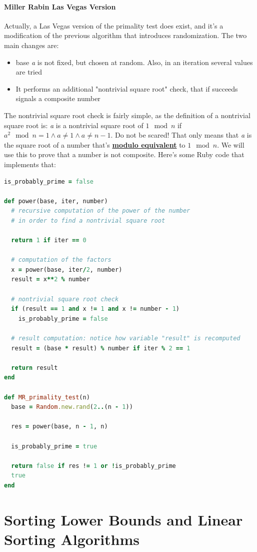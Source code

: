 \documentclass{article}
\begin{document}
				\paragraph{Miller Rabin Las Vegas Version}
					Actually, a Las Vegas version of the primality test does exist, and it's a modification of the previous algorithm that introduces randomization. The two main changes are:
					\begin{itemize}
						\item base \emph{a} is not fixed, but chosen at random. Also, in an iteration several values are tried
						\item It performs an additional "nontrivial square root" check, that if succeeds signals a composite number
					\end{itemize}
					The nontrivial square root check is fairly simple, as the definition of a nontrivial square root is: \emph{a} is a nontrivial square root of $1 \mod n$ if $a^2 \mod n = 1 \wedge a \neq 1 \wedge a \neq n - 1$. Do not be scared! That only means that \emph{a} is the square root of a number that's \textbf{\underline{modulo equivalent}} to $1 \mod n$. We will use this to prove that a number is not composite. Here's some Ruby code that implements that:
					\begin{lstlisting}[language=Ruby]
is_probably_prime = false

def power(base, iter, number)
  # recursive computation of the power of the number
  # in order to find a nontrivial square root

  return 1 if iter == 0
  
  # computation of the factors
  x = power(base, iter/2, number)
  result = x**2 % number

  # nontrivial square root check
  if (result == 1 and x != 1 and x != number - 1)
    is_probably_prime = false 
  
  # result computation: notice how variable "result" is recomputed
  result = (base * result) % number if iter % 2 == 1

  return result
end

def MR_primality_test(n)
  base = Random.new.rand(2..(n - 1))

  res = power(base, n - 1, n)
  
  is_probably_prime = true

  return false if res != 1 or !is_probably_prime
  true
end
					\end{lstlisting}

	
	\section{Sorting Lower Bounds and Linear Sorting Algorithms}
\end{document}
